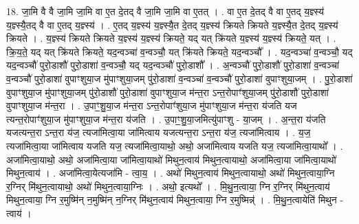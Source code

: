 \documentclass[17pt]{extarticle}
\begin{document}
18. जा॒मि वै वै जा॒मि जा॒मि वा ए॒त दे॒तद् वै जा॒मि जा॒मि वा ए॒तत् । . वा ए॒त दे॒तद् वै वा ए॒तद् य॒ज्ञ्स्य॑ य॒ज्ञ्स्यै॒तद् वै वा ए॒तद् य॒ज्ञ्स्य॑ । . ए॒तद् य॒ज्ञ्स्य॑ य॒ज्ञ्स्यै॒त दे॒तद् य॒ज्ञ्स्य॑ क्रियते क्रियते य॒ज्ञ्स्यै॒त दे॒तद् य॒ज्ञ्स्य॑ क्रियते । . य॒ज्ञ्स्य॑ क्रियते क्रियते य॒ज्ञ्स्य॑ य॒ज्ञ्स्य॑ क्रियते॒ यद् यत् क्रि॑यते य॒ज्ञ्स्य॑ य॒ज्ञ्स्य॑ क्रियते॒ यत् । . क्रि॒य॒ते॒ यद् यत् क्रि॑यते क्रियते॒ यद॒न्वञ्चा॑ व॒न्वञ्चौ॒ यत् क्रि॑यते क्रियते॒ यद॒न्वञ्चौ᳚ । . यद॒न्वञ्चा॑ व॒न्वञ्चौ॒ यद् यद॒न्वञ्चौ॑ पुरो॒डाशौ॑ पुरो॒डाशा॑ व॒न्वञ्चौ॒ यद् यद॒न्वञ्चौ॑ पुरो॒डाशौ᳚ । . अ॒न्वञ्चौ॑ पुरो॒डाशौ॑ पुरो॒डाशा॑ व॒न्वञ्चा॑ व॒न्वञ्चौ॑ पुरो॒डाशा॑ वुपाꣳशुया॒ज मु॑पाꣳशुया॒जम् पु॑रो॒डाशा॑ व॒न्वञ्चा॑ व॒न्वञ्चौ॑ पुरो॒डाशा॑ वुपाꣳशुया॒जम् । . पु॒रो॒डाशा॑ वुपाꣳशुया॒ज मु॑पाꣳशुया॒जम् पु॑रो॒डाशौ॑ पुरो॒डाशा॑ वुपाꣳशुया॒ज म॑न्त॒रा ऽन्त॒रोपाꣳ॑शुया॒जम् पु॑रो॒डाशौ॑ पुरो॒डाशा॑ वुपाꣳशुया॒ज म॑न्त॒रा । . उ॒पाꣳ॒॒शु॒या॒ज म॑न्त॒रा ऽन्त॒रोपाꣳ॑शुया॒ज मु॑पाꣳशुया॒ज म॑न्त॒रा य॑जति यज त्यन्त॒रोपाꣳ॑शुया॒ज मु॑पाꣳशुया॒ज म॑न्त॒रा य॑जति । . उ॒पाꣳ॒॒शु॒या॒जमित्यु॑पाꣳशु - या॒जम् । . अ॒न्त॒रा य॑जति यजत्यन्त॒रा ऽन्त॒रा य॑ज॒ त्यजा॑मित्वा॒या जा॑मित्वाय यजत्यन्त॒रा ऽन्त॒रा य॑ज॒ त्यजा॑मित्वाय । . य॒ज॒ त्यजा॑मित्वा॒या जा॑मित्वाय यजति यज॒ त्यजा॑मित्वा॒याथो॒ अथो॒ अजा॑मित्वाय यजति यज॒ त्यजा॑मित्वा॒याथो᳚ । . अजा॑मित्वा॒याथो॒ अथो॒ अजा॑मित्वा॒या जा॑मित्वा॒याथो॑ मिथुन॒त्वाय॑ मिथुन॒त्वायाथो॒ अजा॑मित्वा॒या जा॑मित्वा॒याथो॑ मिथुन॒त्वाय॑ । . अजा॑मित्वा॒येत्यजा॑मि - त्वा॒य॒ । . अथो॑ मिथुन॒त्वाय॑ मिथुन॒त्वायाथो॒ अथो॑ मिथुन॒त्वाया॒ग्नि र॒ग्निर् मि॑थुन॒त्वायाथो॒ अथो॑ मिथुन॒त्वाया॒ग्निः । . अथो॒ इत्यथो᳚ । . मि॒थु॒न॒त्वाया॒ ग्नि र॒ग्निर् मि॑थुन॒त्वाय॑ मिथुन॒त्वाया॒ ग्नि र॒मुष्मि॑न् न॒मुष्मि॑न् न॒ग्निर् मि॑थुन॒त्वाय॑ मिथुन॒त्वाया॒ ग्नि र॒मुष्मिन्न्॑ । . मि॒थु॒न॒त्वायेति॑ मिथुन - त्वाय॑ । \newline
\end{document}
